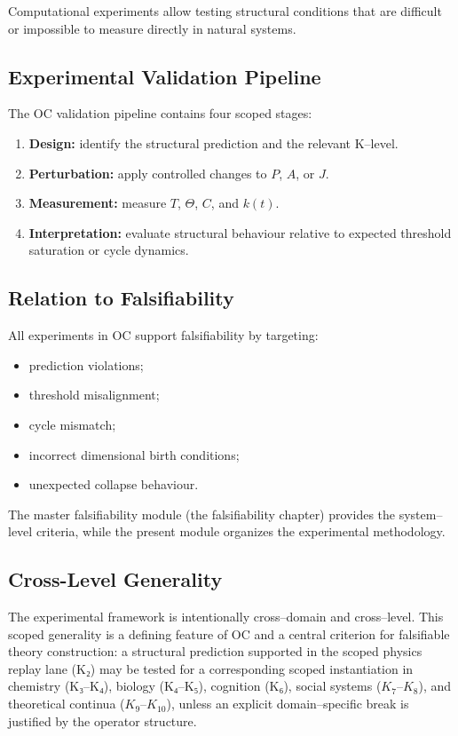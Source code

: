 Computational experiments allow testing structural conditions that are
difficult or impossible to measure directly in natural systems.


\subsection{Experimental Validation Pipeline}

The OC validation pipeline contains four scoped stages:

\begin{enumerate}
    \item \textbf{Design:} identify the structural prediction and the relevant
          K–level.
    \item \textbf{Perturbation:} apply controlled changes to $P$, $A$, or $J$.
    \item \textbf{Measurement:} measure $T$, $\Theta$, $C$, and $k(t)$.
    \item \textbf{Interpretation:} evaluate structural behaviour relative to
          expected threshold saturation or cycle dynamics.
\end{enumerate}


\subsection{Relation to Falsifiability}

All experiments in OC support falsifiability by targeting:

\begin{itemize}
    \item prediction violations;
    \item threshold misalignment;
    \item cycle mismatch;
    \item incorrect dimensional birth conditions;
    \item unexpected collapse behaviour.
\end{itemize}

The master falsifiability module (the falsifiability chapter)
provides the system–level criteria, while the present module organizes the
experimental methodology.


\subsection{Cross-Level Generality}

The experimental framework is intentionally cross–domain and cross–level.
This scoped generality is a defining feature of OC and a central criterion for
falsifiable theory construction:
a structural prediction supported in the scoped physics replay lane (K₂) may be tested for a corresponding scoped instantiation in chemistry (K₃–K₄), biology (K₄–K₅), cognition (K₆), social
systems ($K_7$–$K_8$), and theoretical continua ($K_9$–$K_{10}$), unless an explicit
domain–specific break is justified by the operator structure.



